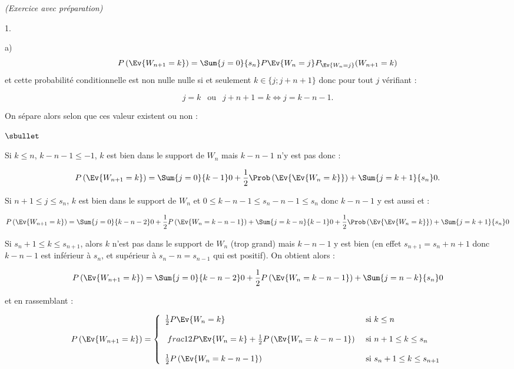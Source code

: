 \documentclass[11pt]{article}%
\begin{document}
\begin{exercice}{\it (Exercice avec préparation)}
\begin{noliste}{1.}
\begin{noliste}{a)}
\[
 P \left(\Ev{ W_{n + 1} = k }\right) = \Sum{j = 0}{ s_{n} } P \Ev{
W_{n} = j } P_{
 \Ev{W_{n} = j} } ( W_{n + 1} = k )
\]
 et cette probabilité conditionnelle est non nulle nulle si et
 seulement $k \in \{ j ; j + n + 1 \}$ donc pour tout $j$
 vérifiant :
 
\[
 j = k \ \ \text{ ou } \ \ j + n + 1 = k \Longleftrightarrow j = k -
 n - 1.
\]
 
 On sépare alors selon que ces valeur existent ou non :
 \begin{noliste}{$\sbullet$}
 \item Si $ k \leq n $, $k-n-1 \leq -1$, $k$ est bien dans le
 support de $W_{n}$ mais $k-n-1$ n'y est pas donc :
 
\[
 P \left(\Ev{ W_{n + 1} = k }\right) = \Sum{j = 0}{k-1} 0 + \frac{ 1 }{
2}
 \Prob\left(\Ev{\Ev{ W_{n} = k }}\right) + \Sum{j = k + 1}{s_{n}} 0.
\]
 
 \item Si $n + 1 \leq j \leq s_{n}$, $k$ est bien dans le support de
 $W_{n}$ et $0 \leq k-n-1 \leq s_{n} - n - 1 \leq s_{n}$ donc $k-n-1$
 y est aussi et :
 
\[
 P \left(\Ev{ W_{n + 1} = k }\right) = \Sum{j = 0}{k-n-2} 0 +
\frac{1}{2} P \left(\Ev{ W_{n}
 = k-n-1 }\right) + \Sum{j = k-n}{k-1} 0 + \frac{ 1 }{ 2 }
\Prob\left(\Ev{\Ev{
 W_{n} = k }}\right) + \Sum{j = k + 1}{s_{n}} 0
\]
 
 \item Si $s_{n} + 1 \leq k \leq s_{n + 1}$, alors $k$ n'est pas dans
 le support de $W_{n}$ (trop grand) mais $k-n-1$ y est bien (en
 effet $s_{n + 1} = s_{n} + n + 1$ donc $k-n-1$ est inférieur à
 $s_{n}$, et supérieur à $s_{n} - n = s_{n-1} $ qui est
 positif). On obtient alors :
 
\[
 P \left(\Ev{ W_{n + 1} = k }\right) = \Sum{j = 0}{k-n-2} 0 +
\frac{1}{2} P \left(\Ev{ W_{n} = 
 k-n-1 }\right) + \Sum{j = n-k}{s_{n}} 0
\]
 \end{noliste}
 et en rassemblant :
 
\[
 P \left(\Ev{ W_{n + 1} = k }\right) = \left\{ 
\begin{array}{ll}
 \frac{ 1 }{ 2 } P \Ev{ W_{n} = k } & \text{ si
 } k \leq n \\
\\\
frac{ 1 }{ 2 } P \Ev{W_{n} = k} + \frac{ 1
 }{ 2 } P \left(\Ev{ W_{n} = k-n-1}\right) & \text{ si } n + 1 \leq k
\leq s_{n} \\
 \\
\frac{ 1 }{ 2 } P \left(\Ev{ W_{n} = k-n-1}\right) & \text{ si } s_{n}
+ 1
 \leq k \leq s_{n + 1}
 \\
\end{array}
 \right.
\]
 \end{noliste}
 \end{noliste}
\end{exercice}
\end{document}
